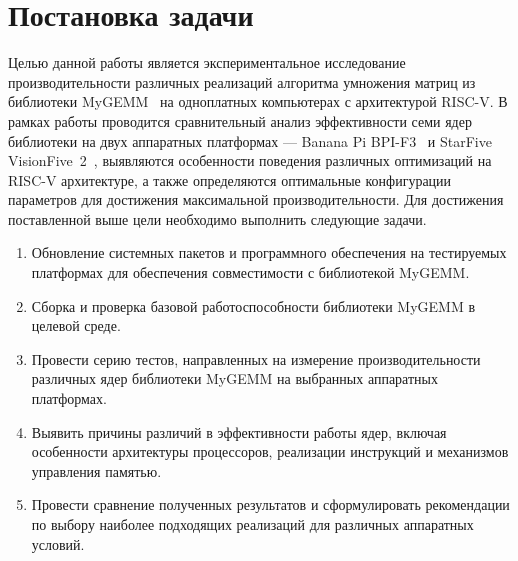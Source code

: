 
\section{Постановка задачи}
\label{sec:task}

Целью данной работы является экспериментальное исследование производительности различных реализаций алгоритма умножения матриц из библиотеки MyGEMM~\cite{mygemm_repo} на одноплатных компьютерах с архитектурой RISC-V. В рамках работы проводится сравнительный анализ эффективности семи ядер библиотеки на двух аппаратных платформах --- Banana Pi BPI-F3~\cite{bananapi_f3_wiki} и StarFive VisionFive~2~\cite{visionfive2_wiki}, выявляются особенности поведения различных оптимизаций на RISC-V архитектуре, а также определяются оптимальные конфигурации параметров для достижения максимальной производительности. Для достижения поставленной выше цели необходимо выполнить следующие задачи.
\begin{enumerate}
    \item Обновление системных пакетов и программного обеспечения на тестируемых платформах для обеспечения совместимости с библиотекой MyGEMM.
    \item Сборка и проверка базовой работоспособности библиотеки MyGEMM в целевой среде.
    \item Провести серию тестов, направленных на измерение производительности различных ядер библиотеки MyGEMM на выбранных аппаратных платформах.
    \item Выявить причины различий в эффективности работы ядер, включая особенности архитектуры процессоров, реализации инструкций и механизмов управления памятью.
    \item Провести сравнение полученных результатов и сформулировать рекомендации по выбору наиболее подходящих реализаций для различных аппаратных условий.
\end{enumerate}